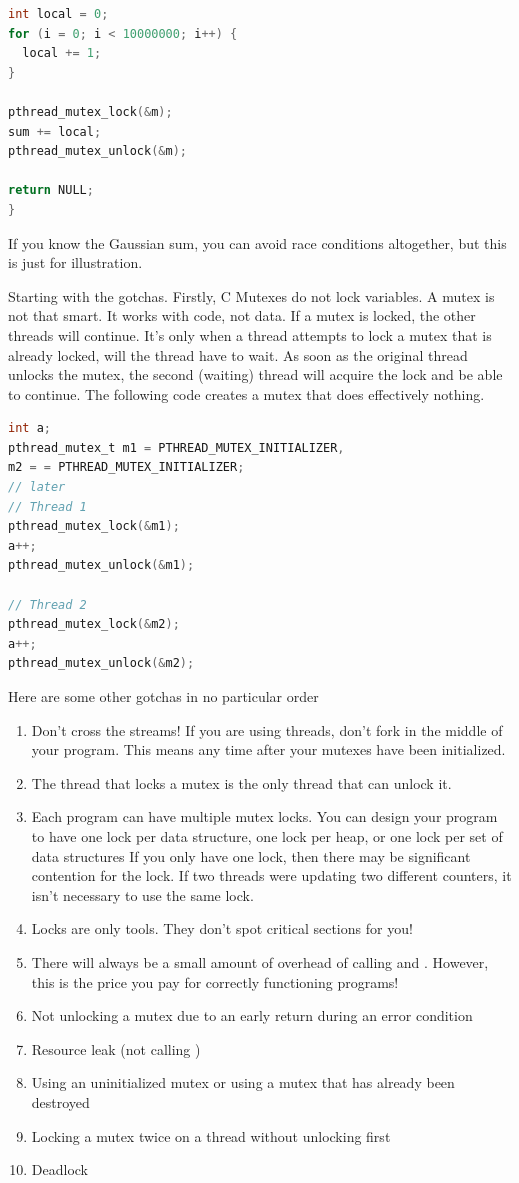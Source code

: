 \begin{lstlisting}[language=C]
int local = 0;
for (i = 0; i < 10000000; i++) {
  local += 1;
}

pthread_mutex_lock(&m);
sum += local;
pthread_mutex_unlock(&m);

return NULL;
}
\end{lstlisting}

If you know the Gaussian sum, you can avoid race conditions altogether, but this is just for illustration.

Starting with the gotchas.
Firstly, C Mutexes do not lock variables.
A mutex is not that smart.
It works with code, not data.
If a mutex is locked, the other threads will continue.
It's only when a thread attempts to lock a mutex that is already locked, will the thread have to wait.
As soon as the original thread unlocks the mutex, the second (waiting) thread will acquire the lock and be able to continue.
The following code creates a mutex that does effectively nothing.

\begin{lstlisting}[language=C]
int a;
pthread_mutex_t m1 = PTHREAD_MUTEX_INITIALIZER,
m2 = = PTHREAD_MUTEX_INITIALIZER;
// later
// Thread 1
pthread_mutex_lock(&m1);
a++;
pthread_mutex_unlock(&m1);

// Thread 2
pthread_mutex_lock(&m2);
a++;
pthread_mutex_unlock(&m2);
\end{lstlisting}

Here are some other gotchas in no particular order
\begin{enumerate}
\item Don't cross the streams!
If you are using threads, don't fork in the middle of your program.
This means any time after your mutexes have been initialized.
\item The thread that locks a mutex is the only thread that can unlock it.
\item Each program can have multiple mutex locks.
  You can design your program to have one lock per data structure,
  one lock per heap,
  or one lock per set of data structures
  If you only have one lock, then there may be significant contention for the lock.
  If two threads were updating two different counters, it isn't necessary to use the same lock.
\item Locks are only tools.
  They don't spot critical sections for you!
\item There will always be a small amount of overhead of calling  and .
However, this is the price you pay for correctly functioning programs!
\item
  Not unlocking a mutex due to an early return during an error condition
\item
  Resource leak (not calling )
\item
  Using an uninitialized mutex or using a mutex that has already been destroyed
\item
  Locking a mutex twice on a thread without unlocking first
\item
  Deadlock
\end{enumerate}

